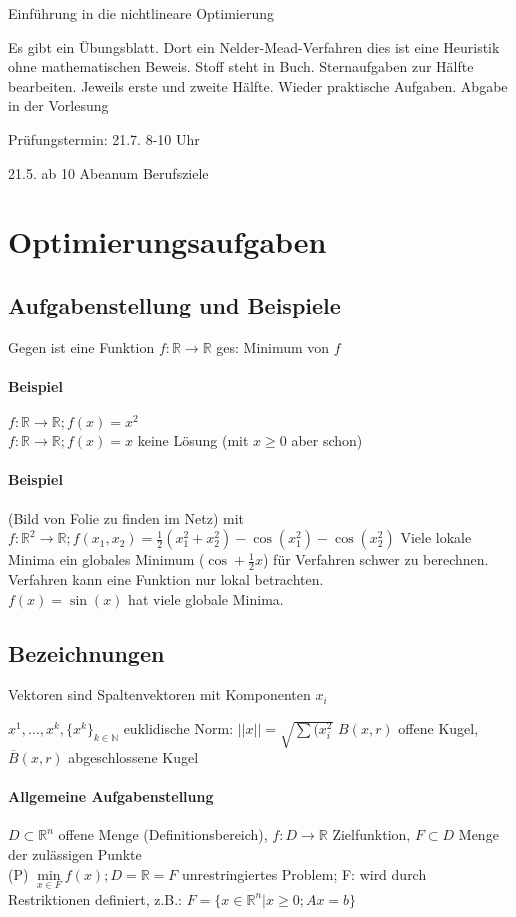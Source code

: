 \documentclass[ngerman,halfparskip]{scrartcl}
\theoremstyle{definition}
\def\R{\mathbb R}
\begin{document}
\huge Einführung in die nichtlineare Optimierung \normalsize

Es gibt ein Übungsblatt. Dort ein Nelder-Mead-Verfahren dies ist eine Heuristik ohne mathematischen Beweis. Stoff steht in Buch. Sternaufgaben zur Hälfte bearbeiten. Jeweils erste und zweite Hälfte. Wieder praktische Aufgaben. Abgabe in der Vorlesung

Prüfungstermin: 21.7. 8-10 Uhr 

21.5. ab 10 Abeanum Berufsziele

\section{Optimierungsaufgaben}
\subsection{Aufgabenstellung und Beispiele}
Gegen ist eine Funktion $f: \R \rightarrow \R$ ges: Minimum von $f$
\paragraph{Beispiel}
$f:\R\rightarrow \R; f(x)=x^2$\\
$f: \R\rightarrow \R; f(x)=x$ keine Lösung (mit $x\geq 0$ aber schon)
\paragraph{Beispiel}(Bild von Folie zu finden im Netz) mit  $f:\R^2\rightarrow\R; f(x_1,x_2)=\frac 12 (x_1^2+x_2^2)-\cos(x_1^2)-\cos(x_2^2)$ Viele lokale Minima ein globales Minimum ($\cos + \frac 1 2 x$) für Verfahren schwer zu berechnen. Verfahren kann eine Funktion nur lokal betrachten.\\
$f(x)=\sin(x)$ hat viele globale Minima.
\subsection*{Bezeichnungen}
Vektoren sind Spaltenvektoren mit Komponenten $x_i$

$x^1,\ldots,x^k, \{x^{k}\}_{k\in\mathbb{N}}$
euklidische Norm: $||x||=\sqrt{\sum(x_i^2}$
$B(x,r)$ offene Kugel, $\overline B(x,r)$ abgeschlossene Kugel\\

\paragraph*{Allgemeine Aufgabenstellung}
$D\subset\R^n$ offene Menge (Definitionsbereich), $f:D\rightarrow\R$ Zielfunktion, $F\subset D$ Menge der zulässigen Punkte\\
(P) $\min\limits_{x\in F} f(x); D=\R=F$ unrestringiertes Problem; F: wird durch Restriktionen definiert, z.B.: $F=\{x\in\R^n | x\geq 0; Ax=b\}$\\
\end{document}

